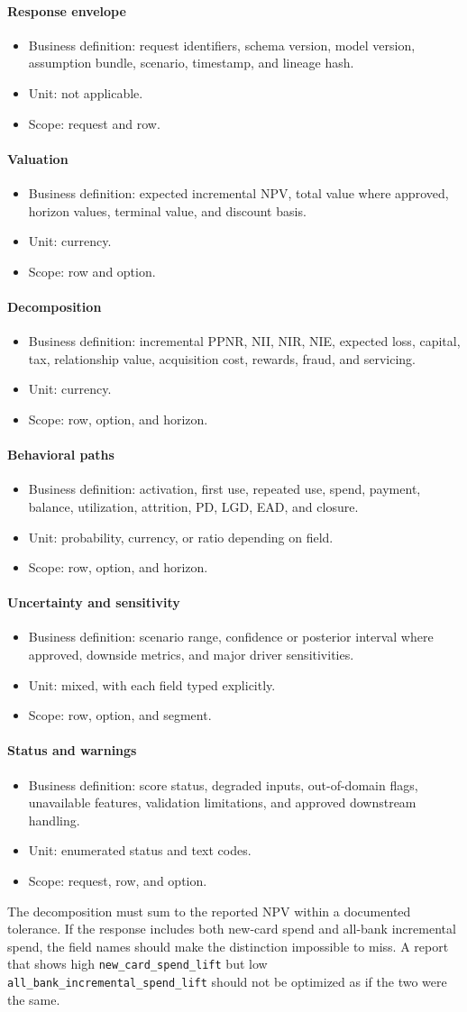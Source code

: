 \documentclass[11pt]{article}
\newcommand{\1}{\mathbf{1}}
\newcommand{\code}[1]{\nolinkurl{#1}}
\newcommand{\contractitem}[2]{\paragraph{#1}\begin{itemize}[leftmargin=1.5em,itemsep=0.12em,topsep=0.18em]#2\end{itemize}}
\begin{document}
\contractitem{Response envelope}{
  \item Business definition: request identifiers, schema version, model
        version, assumption bundle, scenario, timestamp, and lineage hash.
  \item Unit: not applicable.
  \item Scope: request and row.
}
\contractitem{Valuation}{
  \item Business definition: expected incremental NPV, total value where
        approved, horizon values, terminal value, and discount basis.
  \item Unit: currency.
  \item Scope: row and option.
}
\contractitem{Decomposition}{
  \item Business definition: incremental PPNR, NII, NIR, NIE, expected loss,
        capital, tax, relationship value, acquisition cost, rewards, fraud,
        and servicing.
  \item Unit: currency.
  \item Scope: row, option, and horizon.
}
\contractitem{Behavioral paths}{
  \item Business definition: activation, first use, repeated use, spend,
        payment, balance, utilization, attrition, PD, LGD, EAD, and closure.
  \item Unit: probability, currency, or ratio depending on field.
  \item Scope: row, option, and horizon.
}
\contractitem{Uncertainty and sensitivity}{
  \item Business definition: scenario range, confidence or posterior interval
        where approved, downside metrics, and major driver sensitivities.
  \item Unit: mixed, with each field typed explicitly.
  \item Scope: row, option, and segment.
}
\contractitem{Status and warnings}{
  \item Business definition: score status, degraded inputs, out-of-domain
        flags, unavailable features, validation limitations, and approved
        downstream handling.
  \item Unit: enumerated status and text codes.
  \item Scope: request, row, and option.
}

The decomposition must sum to the reported NPV within a documented tolerance.
If the response includes both new-card spend and all-bank incremental spend,
the field names should make the distinction impossible to miss. A report that
shows high \code{new_card_spend_lift} but low
\code{all_bank_incremental_spend_lift} should not be optimized as if the two
were the same.
\end{document}
